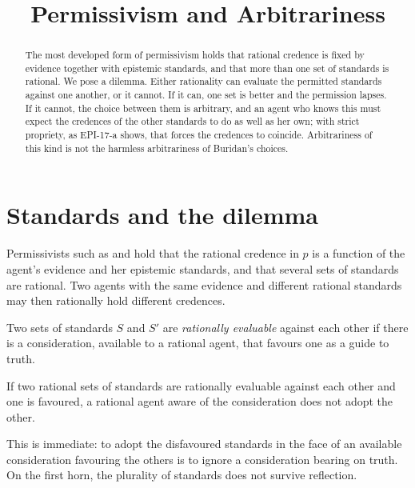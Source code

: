 \documentclass{situationist-preprint}
\title{Permissivism and Arbitrariness}
\begin{document}
\maketitle

\begin{abstract}
The most developed form of permissivism holds that rational credence is fixed by evidence together with epistemic standards, and that more than one set of standards is rational. We pose a dilemma. Either rationality can evaluate the permitted standards against one another, or it cannot. If it can, one set is better and the permission lapses. If it cannot, the choice between them is arbitrary, and an agent who knows this must expect the credences of the other standards to do as well as her own; with strict propriety, as EPI-17-a shows, that forces the credences to coincide. Arbitrariness of this kind is not the harmless arbitrariness of Buridan's choices.
\end{abstract}

\section{Standards and the dilemma}

Permissivists such as \citet{Schoenfield2014} and \citet{Kelly2014} hold that the rational credence in $p$ is a function of the agent's evidence and her epistemic standards, and that several sets of standards are rational. Two agents with the same evidence and different rational standards may then rationally hold different credences.

\begin{definition}\label{d:eval}
Two sets of standards $S$ and $S'$ are \emph{rationally evaluable} against each other if there is a consideration, available to a rational agent, that favours one as a guide to truth.
\end{definition}

\begin{proposition}\label{p:horn1}
If two rational sets of standards are rationally evaluable against each other and one is favoured, a rational agent aware of the consideration does not adopt the other.
\end{proposition}

This is immediate: to adopt the disfavoured standards in the face of an available consideration favouring the others is to ignore a consideration bearing on truth. On the first horn, the plurality of standards does not survive reflection.
\end{document}
